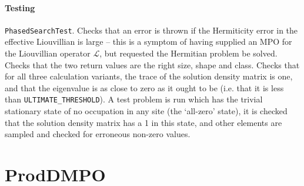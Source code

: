  \paragraph{Testing} \lstinline$PhasedSearchTest$. Checks that an error is thrown if the Hermiticity error in the effective Liouvillian is large -- this is a symptom of having supplied an MPO for the Liouvillian operator \(\mathcal{L}\), but requested the Hermitian problem be solved. Checks that the two return values are the right size, shape and class. Checks that for all three calculation variants, the trace of the solution density matrix is one, and that the eigenvalue is as close to zero as it ought to be (i.e. that it is less than \lstinline$ULTIMATE_THRESHOLD$). A test problem is run which has the trivial stationary state of no occupation in any site (the `all-zero' state), it is checked that the solution density matrix has a 1 in this state, and other elements are sampled and checked for erroneous non-zero values.

 \section{ProdDMPO}
